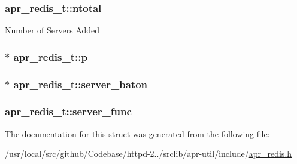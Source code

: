 \subsubsection[{\texorpdfstring{ntotal}{ntotal}}]{ apr\+\_\+redis\+\_\+t\+::ntotal}\hypertarget{structapr__redis__t_a75200230ca97f0c21e20e99be4aa08d4}{}\label{structapr__redis__t_a75200230ca97f0c21e20e99be4aa08d4}
Number of Servers Added 
\subsubsection[{\texorpdfstring{p}{p}}]{$\ast$ apr\+\_\+redis\+\_\+t\+::p}\hypertarget{structapr__redis__t_a5384cf2f759115eb0056edb3aebed90f}{}\label{structapr__redis__t_a5384cf2f759115eb0056edb3aebed90f}
\subsubsection[{\texorpdfstring{server\+\_\+baton}{server_baton}}]{$\ast$ apr\+\_\+redis\+\_\+t\+::server\+\_\+baton}\hypertarget{structapr__redis__t_a25c19a3b4bf0774c7654aa17d52824ff}{}\label{structapr__redis__t_a25c19a3b4bf0774c7654aa17d52824ff}
\subsubsection[{\texorpdfstring{server\+\_\+func}{server_func}}]{ apr\+\_\+redis\+\_\+t\+::server\+\_\+func}\hypertarget{structapr__redis__t_a8d4932d4a1a858ce74430ad41951ee41}{}\label{structapr__redis__t_a8d4932d4a1a858ce74430ad41951ee41}


The documentation for this struct was generated from the following file\+:\begin{DoxyCompactItemize}
\item 
/usr/local/src/github/\+Codebase/httpd-\/2../srclib/apr-\/util/include/\hyperlink{apr__redis_8h}{apr\+\_\+redis.\+h}\end{DoxyCompactItemize}
